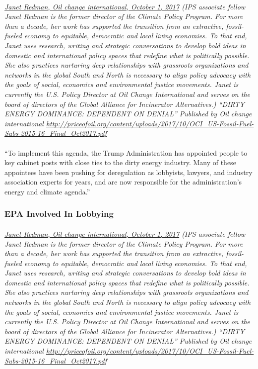 \documentclass{article}
\begin{document}
\paragraph{}
\small
\textit{
\underline{Janet Redman, Oil change international, October 1, 2017}
(IPS associate fellow Janet Redman is the former director of the Climate Policy Program. For more than a decade, her work has supported the transition from an extractive, fossil-fueled economy to equitable, democratic and local living economies. To that end, Janet uses research, writing and strategic conversations to develop bold ideas in domestic and international policy spaces that redefine what is politically possible. She also practices nurturing deep relationships with grassroots organizations and networks in the global South and North is necessary to align policy advocacy with the goals of social, economics and environmental justice movements. Janet is currently the U.S. Policy Director at Oil Change International and serves on the board of directors of the Global Alliance for Incinerator Alternatives.) “DIRTY ENERGY DOMINANCE: DEPENDENT ON DENIAL” Published by Oil change international
\url{http://priceofoil.org/content/uploads/2017/10/OCI_US-Fossil-Fuel-Subs-2015-16_Final_Oct2017.pdf }}
\normalsize

\paragraph{}
``To implement this agenda, the Trump Administration has appointed people to key cabinet posts with close ties to the dirty energy industry. Many of these appointees have been pushing for deregulation as lobbyists, lawyers, and industry association experts for years, and are now responsible for the administration’s energy and climate agenda.”

\subsubsection{EPA Involved In Lobbying}
\paragraph{}
\small
\textit{
\underline{Janet Redman, Oil change international, October 1, 2017}
(IPS associate fellow Janet Redman is the former director of the Climate Policy Program. For more than a decade, her work has supported the transition from an extractive, fossil-fueled economy to equitable, democratic and local living economies. To that end, Janet uses research, writing and strategic conversations to develop bold ideas in domestic and international policy spaces that redefine what is politically possible. She also practices nurturing deep relationships with grassroots organizations and networks in the global South and North is necessary to align policy advocacy with the goals of social, economics and environmental justice movements. Janet is currently the U.S. Policy Director at Oil Change International and serves on the board of directors of the Global Alliance for Incinerator Alternatives.) “DIRTY ENERGY DOMINANCE: DEPENDENT ON DENIAL” Published by Oil change international
\url{http://priceofoil.org/content/uploads/2017/10/OCI_US-Fossil-Fuel-Subs-2015-16_Final_Oct2017.pdf }}
\normalsize
\end{document}

